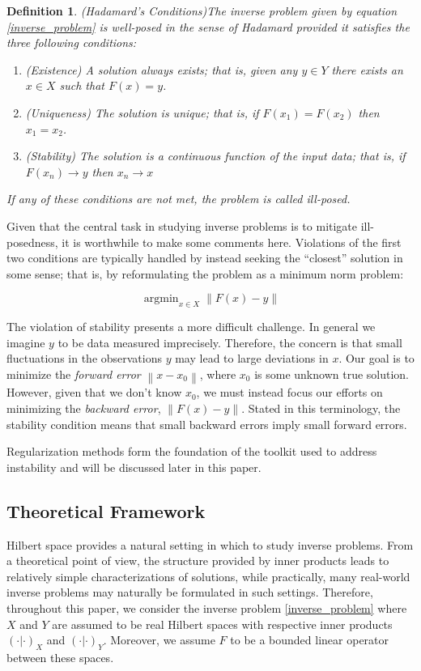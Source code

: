 \documentclass[12pt]{article}
\newcommand*{\norm}[1]{\left\lVert#1\right\rVert}
\DeclareMathOperator*{\argmin}{argmin}
\newtheorem{definition}{Definition}
\begin{document}
\begin{definition} 
(Hadamard's Conditions)The inverse problem given by equation \eqref{inverse_problem} is well-posed in the sense of Hadamard 
provided it satisfies the three following conditions:
\begin{enumerate} 
\item (Existence) A solution always exists; that is, given any $y \in Y$ there exists an $x \in X$ such that $F(x) = y$. 
\item (Uniqueness) The solution is unique; that is, if $F(x_1) = F(x_2)$ then $x_1 = x_2$.
\item (Stability) The solution is a continuous function of the input data; that is, if $F(x_n) \to y$  then $x_n \to x$
\end{enumerate} 
If any of these conditions are not met, the problem is called ill-posed. 
\end{definition} 

Given that the central task in studying inverse problems is to mitigate ill-posedness, it is worthwhile to make some comments here. 
Violations of the first two conditions are typically handled by 
instead seeking the ``closest'' solution in some sense; that is, by reformulating the problem as a minimum norm problem: 

\begin{equation}
\argmin_{x \in X} \norm{F(x) - y} \label{min_norm}
\end{equation}

 The violation of stability presents a more difficult challenge. In general we imagine $y$ to be data measured imprecisely. 
 Therefore, the concern is that small fluctuations in the observations $y$ may lead to large deviations in $x$. 
Our goal is to minimize the \textit{forward error} $\norm{x - x_0}$, where $x_0$ is some unknown true solution. However, 
given that we don't know $x_0$, we must instead focus our efforts on minimizing the \textit{backward error}, $\norm{F(x) - y}$. 
Stated in this terminology, the stability condition means that small backward errors imply small forward errors. 

 Regularization methods form the foundation of the toolkit used to address instability and will be discussed later in this paper. 

\subsection{Theoretical Framework}

Hilbert space provides a natural setting in which to study inverse problems. From a theoretical point of view, the structure provided by 
inner products leads to relatively simple characterizations of solutions, while practically, many real-world inverse problems may 
naturally be formulated in such settings. Therefore, throughout this paper, we consider the inverse problem \eqref{inverse_problem}
where $X$ and $Y$ are assumed to be real Hilbert spaces with respective inner products $(\cdot | \cdot)_X$ and $(\cdot | \cdot)_Y$. 
Moreover, we assume $F$ to be a bounded linear operator between these spaces. 
\end{document}
